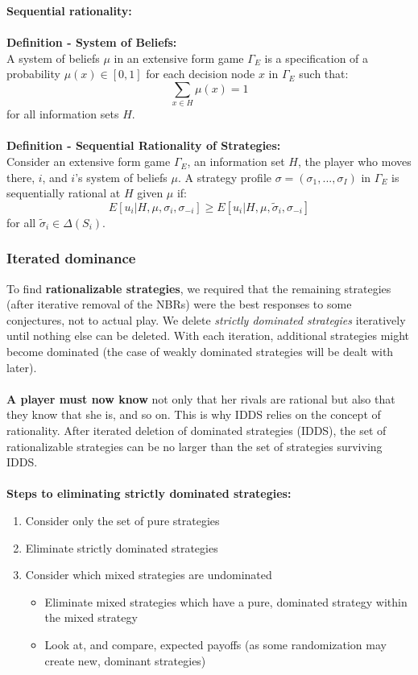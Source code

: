 \documentclass{article}
\begin{document}
\noindent \textbf{Sequential rationality:} \\
\\
\textbf{Definition - System of Beliefs:} \\
A system of beliefs $\mu$ in an extensive form game $\Gamma_E$ is a specification of a probability $\mu(x) \in [0,1]$ for each decision node $x$ in $\Gamma_E$ such that:
\[
\sum_{x\in H} \mu(x) = 1
\]
for all information sets $H$.
\\
\\
\textbf{Definition - Sequential Rationality of Strategies:} \\
Consider an extensive form game $\Gamma_E$, an information set $H$, the player who moves there, $i$, and $i$'s system of beliefs $\mu$. A strategy profile $\sigma = (\sigma_1, ..., \sigma_I)$ in $\Gamma_E$ is sequentially rational at $H$ given $\mu$ if:
\[
E [u_i | H, \mu, \sigma_i , \sigma_{-i} ] \geq E [u_i | H, \mu, \tilde{\sigma}_i , \sigma_{-i} ]
\]
for all $\tilde{\sigma}_i \in \Delta(S_i)$.



\subsubsection{Iterated dominance}\label{ISD}

To find \textbf{rationalizable strategies}, we required that the remaining strategies (after iterative removal of the NBRs) were the best responses to some conjectures, not to actual play. We delete \textit{strictly dominated strategies} iteratively until nothing else can be deleted. With each iteration, additional strategies might become dominated (the case of weakly dominated strategies will be dealt with later). \\
\\
\noindent \textbf{A player must now know} not only that her rivals are rational but also that they know that she is, and so on. This is why IDDS relies on the concept of rationality. After iterated deletion of dominated strategies (IDDS), the set of rationalizable strategies can be no larger than the set of strategies surviving IDDS. 
\\
\\
\noindent \textbf{Steps to eliminating strictly dominated strategies: }
\begin{enumerate}
    \item Consider only the set of pure strategies
    \item Eliminate strictly dominated strategies 
    \item Consider which mixed strategies are undominated
    \begin{itemize}
        \item Eliminate mixed strategies which have a pure, dominated strategy within the mixed strategy
        \item Look at, and compare, expected payoffs (as some randomization may create new, dominant strategies)
    \end{itemize}
\end{enumerate}
\end{document}
